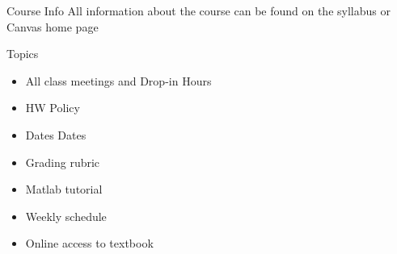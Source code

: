 \documentclass[10pt]{beamer}
\begin{document}



\begin{frame}{Course Info}
All information about the course can be found on the syllabus or Canvas home page
\begin{block}{Topics}
   \begin{itemize}
      \item All class meetings and Drop-in Hours
      \item HW Policy
      \item Dates Dates
      \item Grading rubric
      \item Matlab tutorial
      \item Weekly schedule
      \item Online access to textbook
   \end{itemize}
\end{block}
\bigskip

\end{frame}
\end{document}
